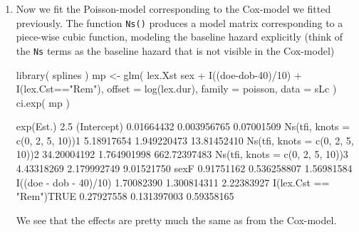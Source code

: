 \begin{enumerate}[resume]

\item Now we fit the Poisson-model corresponding to the Cox-model
  we fitted previously. The function \texttt{Ns()} produces a model
  matrix corresponding to a piece-wise cubic function, modeling the
  baseline hazard explicitly (think of the \texttt{Ns} terms as the
  baseline hazard that is not visible in the Cox-model)
\begin{Schunk}
\begin{Sinput}
 library( splines )
 mp <- glm( lex.Xst %in% EP ~ Ns( tfi, knots=c(0,2,5,10) ) +
            sex + I((doe-dob-40)/10) + I(lex.Cst=="Rem"),
            offset = log(lex.dur),
            family = poisson,
              data = sLc )
 ci.exp( mp )
\end{Sinput}
\begin{Soutput}
                                   exp(Est.)        2.5%        97.5%
(Intercept)                       0.01664432 0.003956765   0.07001509
Ns(tfi, knots = c(0, 2, 5, 10))1  5.18917654 1.949220473  13.81452410
Ns(tfi, knots = c(0, 2, 5, 10))2 34.20004192 1.764901998 662.72397483
Ns(tfi, knots = c(0, 2, 5, 10))3  4.43318269 2.179992749   9.01521750
sexF                              0.91751162 0.536258807   1.56981584
I((doe - dob - 40)/10)            1.70082390 1.300814311   2.22383927
I(lex.Cst == "Rem")TRUE           0.27927558 0.131397003   0.59358165
\end{Soutput}
\end{Schunk}
We see that the effects are pretty much the same as from the
Cox-model.



\end{enumerate}
